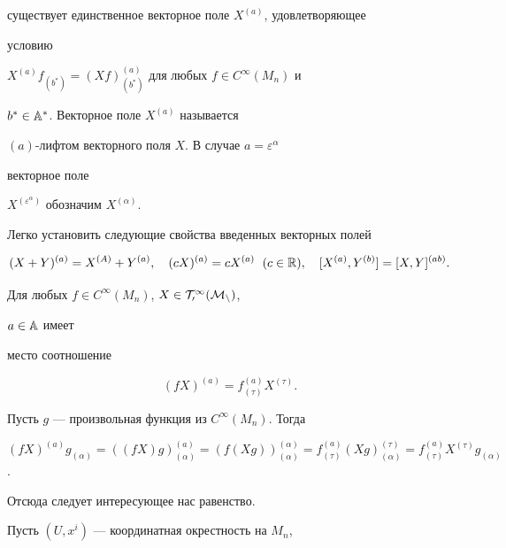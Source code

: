 существует единственное векторное поле $X^{(a)}$, удовлетворяющее 


условию 


$X^{(a)}f_{(b^*)}=(X f)^{(a)}_{(b^*)}$ для любых $f\in C^\infty(M_n)$ и 


$b^*\in\Bbb A^*$. Векторное поле $X^{(a)}$ называется 


$(a)$-лифтом векторного поля $X$. В случае $a=\varepsilon^\alpha$ 


векторное поле  


$X^{(\varepsilon^\alpha)}$ обозначим $X^{(\alpha)}$.  


 


Легко установить следующие свойства введенных векторных полей 


$$ 


(X+Y)^{(a)}=X^{(A)}+Y^{(a)},\quad 


(c X)^{(a)}=c X^{(a)}\ \; (c\in\Bbb R),\quad 


[X^{(a)},Y^{(b)}]=[X,Y]^{(a b)}. 


$$ 


 


\begin{props} Для любых $f\in C^\infty(M_n)$, $X\in\cal T^1_0(M_n)$, 


$a\in\Bbb A$ имеет  


место соотношение 


$$ 


(f X)^{(a)}=f^{(a)}_{(\tau)}X^{(\tau)}. 


$$ 


\end{props} 


 


\begin{pf} Пусть $g$ --- произвольная функция из $C^\infty(M_n)$. Тогда 


$(f X)^{(a)}g_{(\alpha)}=((f X)g)^{(a)}_{(\alpha)}=(f(X 


g))^{(\alpha)}_{(\alpha)}=f^{(a)}_{(\tau)}(X g)^{(\tau)}_{(\alpha)}= 


f^{(a)}_{(\tau)}X^{(\tau)}g_{(\alpha)}$. 


Отсюда следует интересующее нас равенство. 


\end{pf} 


 


Пусть $(U,x^i)$ --- координатная окрестность на $M_n$, 


